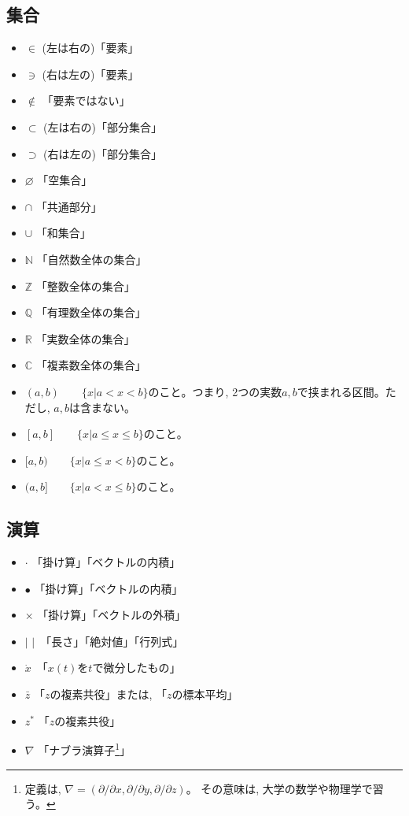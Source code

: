 \subsection*{集合}\label{symbol_set}
\begin{itemize}
\item $\in$ (左は右の)「要素」
\item $\ni$ (右は左の)「要素」
\item $\notin$ 「要素ではない」
\item $\subset$ (左は右の)「部分集合」
\item $\supset$ (右は左の)「部分集合」
\item $\varnothing$ 「空集合」
\item $\cap$ 「共通部分」
\item $\cup$ 「和集合」
\item $\mathbb{N}$ 「自然数全体の集合」
\item $\mathbb{Z}$ 「整数全体の集合」
\item $\mathbb{Q}$ 「有理数全体の集合」
\item $\mathbb{R}$ 「実数全体の集合」
\item $\mathbb{C}$ 「複素数全体の集合」
\item $(a, b)$　　$\{x|a<x<b\}$のこと。つまり, 2つの実数$a, b$で挟まれる区間。ただし, $a, b$は含まない。
\item $[a, b]$　　$\{x|a\leq x\leq b\}$のこと。
\item $[a, b)$　　$\{x|a\leq x < b\}$のこと。
\item $(a, b]$　　$\{x|a< x\leq b\}$のこと。
\end{itemize}

\subsection*{演算}
\begin{itemize}
\item $\cdot$ 「掛け算」「ベクトルの内積」
\item $\bullet$ 「掛け算」「ベクトルの内積」
\item $\times$ 「掛け算」「ベクトルの外積」
\item $|\,\,|\,$ 「長さ」「絶対値」「行列式」
\item $\dot{x}\,$ 「$x(t)$を$t$で微分したもの」
\item $\bar{z}$ 「$z$の複素共役」または, 「$z$の標本平均」
\item $z^{*}$ 「$z$の複素共役」
\item $\nabla$ 「ナブラ演算子\footnote{定義は, $\nabla=(\partial/\partial x, \partial/\partial y, \partial/\partial z)$。
その意味は, 大学の数学や物理学で習う。}」
\end{itemize}

